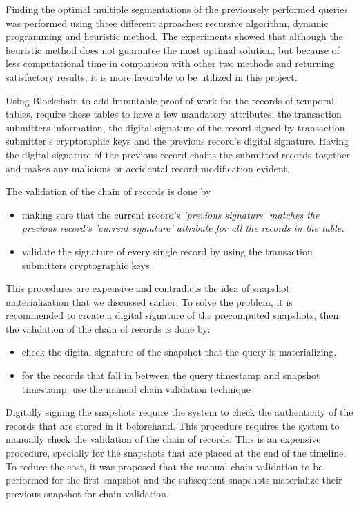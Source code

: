 		Finding the optimal multiple segmentations of the previousely performed queries was performed using three different aproaches: recursive algorithm, dynamic programming and heuristic method. The experiments showed that although the heuristic method does not guarantee the most optimal solution, but because of less computational time in comparison with other two methods and returning satisfactory results, it is more favorable to be utilized in this project.

		Using Blockchain to add immutable proof of work for the records of temporal tables, require these tables to have a few mandatory attributes: the transaction submitters information, the digital signature of the record signed by transaction submitter's cryptoraphic keys and the previous record's digital signature. Having the digital signature of the previous record chains the submitted records together and makes any malicious or accidental record modification evident.

		The validation of the chain of records is done by
		\begin{itemize}
			\item making sure that the current record's \it{'previous signature'} matches the previous record's \it{'current signature'} attribute for all the records in the table.
			\item validate the signature of every single record by using the transaction submitters cryptographic keys.
		\end{itemize}
		
		This procedures are expensive and contradicts the idea of snapshot materialization that we discussed earlier. To solve the problem, it is recommended to create a digital signature of the precomputed snapshots, then the validation of the chain of records is done by:
		\begin{itemize}
			\item check the digital signature of the snapshot that the query is materializing.
			\item for the records that fall in between the query timestamp and snapshot timestamp, use the manual chain validation technique
		\end{itemize}

		Digitally signing the snapshots require the system to check the authenticity of the records that are stored in it beforehand. This procedure requires the system to manually check the validation of the chain of records. This is an expensive procedure, specially for the snapshots that are placed at the end of the timeline. To reduce the cost, it was proposed that the manual chain validation to be performed for the first snapshot and the subsequent snapshots materialize their previous snapshot for chain validation.

